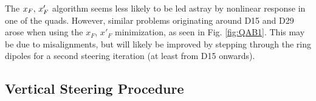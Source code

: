 The $x_F,\thinspace x'_F$ algorithm seems less likely to be led astray by nonlinear response in one of the quads. However, similar problems originating around D15 and D29 arose when using the $x_F$, $x'_F$ minimization, as seen in Fig. \ref{fig:QAB1}. This may be due to misalignments, but will likely be improved by stepping through the ring dipoles for a second steering iteration (at least from D15 onwards). 



\subsection{Vertical Steering Procedure}

\begin{figure}[h]
\centering
{}
\hspace{.05in}
\end{figure}
